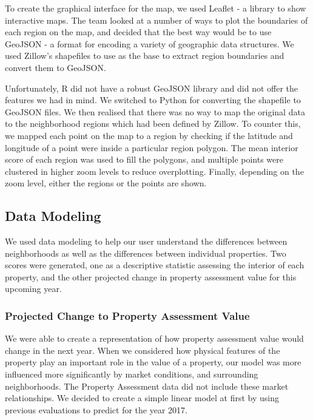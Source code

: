 \documentclass[12pt]{article}
\begin{document}
To create the graphical interface for the map, we used Leaflet
\cite{Leafleta41:online,Leafletf18:online} - a library to show
interactive maps. The team looked at a number of ways to plot the
boundaries of each region on the map, and decided that the best way would
be to use GeoJSON \cite{RFC7946T67:online} - a format for encoding a
variety of geographic data structures. We used Zillow's shapefiles
\cite{ZillowNe81:online} to use as the base to extract region boundaries
and convert them to GeoJSON. 

Unfortunately, R did not have a robust GeoJSON library and did not 
offer the features we had in mind. We switched to Python for converting
the shapefile to GeoJSON files. We then realised that there was no way to
map the original data to the neighborhood regions which had been defined
by Zillow. To counter this, we mapped each point on the map to a region
by checking if the latitude and longitude of a point were inside a
particular region polygon. The mean interior score
of each region was used to fill the polygons, and multiple points were
clustered in higher zoom levels to reduce overplotting. Finally,
depending on the zoom level, either the regions or the points are shown.


\subsection{Data Modeling}

We used data modeling to help our user understand the differences between
neighborhoods as well as the differences between individual properties.
Two scores were generated, one as a descriptive statistic assessing the
interior of each property, and the other projected change in property
assessment value for this upcoming year. 

\subsubsection{Projected Change to Property Assessment Value}

We were able to create a representation of how property assessment
value would change in the next year. When we considered how physical
features of the property play an important role in the value of a
property, our model was more influenced more significantly by market
conditions, and surrounding neighborhoods. The Property Assessment data
did not include these market relationships. We decided to create a
simple linear model at first by using previous evaluations to predict for
the year 2017.
\end{document}

